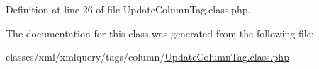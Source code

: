 Definition at line 26 of file Update\-Column\-Tag.\-class.\-php.



The documentation for this class was generated from the following file\-:\begin{DoxyCompactItemize}
\item 
classes/xml/xmlquery/tags/column/\hyperlink{UpdateColumnTag_8class_8php}{Update\-Column\-Tag.\-class.\-php}\end{DoxyCompactItemize}
